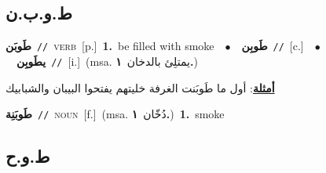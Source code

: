 \documentclass[10pt,a4paper,twoside]{article} %
\begin{document}
\begin{multicols}{2}
\vspace{-3mm}
\subsection*{\color{blue}\foreignlanguage{arabic}{ط.و.ب.ن}\color{blue}{}} 

{\setlength\topsep{0pt}\textbf{\foreignlanguage{arabic}{طَوبَن}}\ {\color{gray}\texttt{//}\color{black}}\ \textsc{verb}\ [p.]\ \textbf{1.}~be filled with smoke\ \ $\bullet$\ \ \setlength\topsep{0pt}\textbf{\foreignlanguage{arabic}{طَوبِن}}\ {\color{gray}\texttt{//}\color{black}}\ [c.]\ \ $\bullet$\ \ \setlength\topsep{0pt}\textbf{\foreignlanguage{arabic}{يطَوبِن}}\ {\color{gray}\texttt{//}\color{black}}\ [i.]\ \color{gray}(msa. \foreignlanguage{arabic}{يمتلِئ بالدخان}~\foreignlanguage{arabic}{\textbf{١.}})\color{black}\  \begin{flushright}\color{gray}\foreignlanguage{arabic}{\textbf{\underline{\foreignlanguage{arabic}{أمثلة}}}: أول ما طَوبَنت الغرفة خليتهم يفتحوا البيبان والشبابيك}\end{flushright}\color{black}} \vspace{2mm}

{\setlength\topsep{0pt}\textbf{\foreignlanguage{arabic}{طَوبَنِة}}\ {\color{gray}\texttt{//}\color{black}}\ \textsc{noun}\ [f.]\ \color{gray}(msa. \foreignlanguage{arabic}{دُخّان}~\foreignlanguage{arabic}{\textbf{١.}})\color{black}\ \textbf{1.}~smoke\ } \vspace{2mm}

\vspace{-3mm}
\subsection*{\color{blue}\foreignlanguage{arabic}{ط.و.ح}\color{blue}{}} 


\end{multicols}
\end{document}
